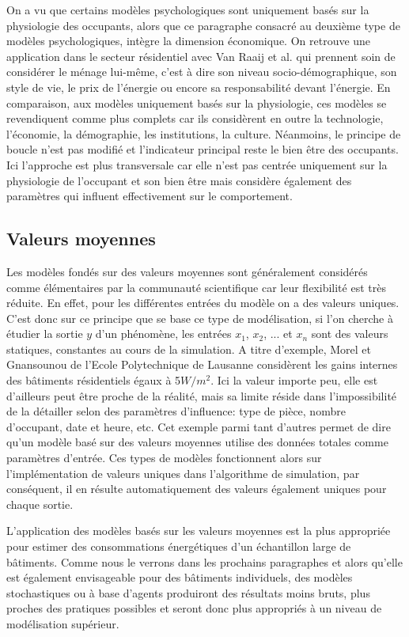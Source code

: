 On a vu que certains modèles psychologiques sont uniquement basés sur la physiologie des occupants, alors que ce paragraphe consacré au deuxième type de modèles psychologiques, intègre la dimension économique. On retrouve une application dans le secteur résidentiel avec Van Raaij et al. \cite{VanRaaij-83} qui prennent soin de considérer le ménage lui-même, c'est à dire son niveau socio-démographique, son style de vie, le prix de l'énergie ou encore sa responsabilité devant l'énergie. En comparaison, aux modèles uniquement basés sur la physiologie, ces modèles se revendiquent comme plus complets car ils considèrent en outre la technologie, l'économie, la démographie, les institutions, la culture. Néanmoins, le principe de boucle n'est pas modifié et l'indicateur principal reste le bien être des occupants. Ici l'approche est plus transversale car elle n'est pas centrée uniquement sur la physiologie de l'occupant et son bien être mais considère également des paramètres qui influent effectivement sur le comportement.

\subsection{Valeurs moyennes}

Les modèles fondés sur des valeurs moyennes sont généralement considérés comme élémentaires par la communauté scientifique car leur flexibilité est très réduite. En effet, pour les différentes entrées du modèle on a des valeurs uniques. C'est donc sur ce principe que se base ce type de modélisation, si l'on cherche à étudier la sortie $y$ d'un phénomène, les entrées $x_1$, $x_2$, $...$ et $x_n$ sont des valeurs statiques, constantes au cours de la simulation. A titre d'exemple, Morel et Gnansounou de l'Ecole Polytechnique de Lausanne \cite{Morel-09} considèrent les gains internes des bâtiments résidentiels égaux à 5$W/m^{2}$. Ici la valeur importe peu, elle est d'ailleurs peut être proche de la réalité, mais sa limite réside dans l'impossibilité de la détailler selon des paramètres d'influence: type de pièce, nombre d'occupant, date et heure, etc. Cet exemple parmi tant d'autres permet de dire qu'un modèle basé sur des valeurs moyennes utilise des données totales comme paramètres d'entrée. Ces types de modèles fonctionnent alors sur l'implémentation de valeurs uniques dans l'algorithme de simulation, par conséquent, il en résulte automatiquement des valeurs également uniques pour chaque sortie.

L'application des modèles basés sur les valeurs moyennes est la plus appropriée pour estimer des consommations énergétiques d'un échantillon large de bâtiments. Comme nous le verrons dans les prochains paragraphes et alors qu'elle est également envisageable pour des bâtiments individuels, des modèles stochastiques ou à base d'agents produiront des résultats moins bruts, plus proches des pratiques possibles et seront donc plus appropriés à un niveau de modélisation supérieur.

